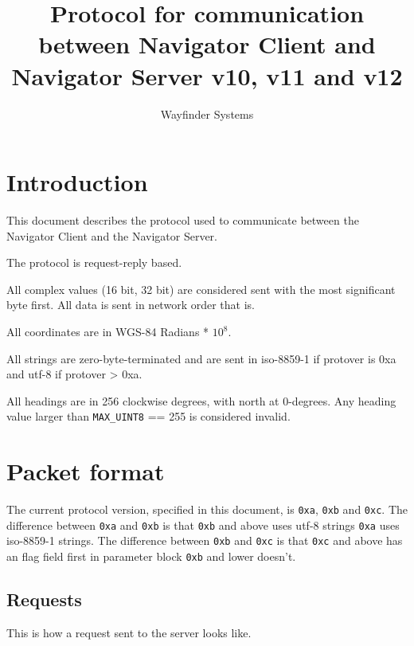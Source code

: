 \documentclass[a4paper]{article}
\title{Protocol for communication between Navigator Client and Navigator 
 Server v10, v11 and v12}
\author{Wayfinder Systems}
\begin{document}
\maketitle
\tableofcontents
\newpage



\section{Introduction}

This document describes the protocol used to communicate
between the Navigator Client and the Navigator Server.

The protocol is request-reply based.

All complex values (16 bit, 32 bit) are considered sent with
the most significant byte first. All data is sent in network order that is.

All coordinates are in WGS-84 Radians * $10^8$.

All strings are zero-byte-terminated and are sent in iso-8859-1 if
protover is 0xa and utf-8 if protover > 0xa.

All headings are in 256 clockwise degrees, with north at 0-degrees.
Any heading value larger than {\tt MAX\_UINT8} == 255 is considered invalid.



\section{Packet format}

The current protocol version, specified in this document, is {\tt 0xa}, 
{\tt 0xb} and {\tt 0xc}. 
The difference between {\tt 0xa} and {\tt 0xb} is that {\tt 0xb} and above
uses utf-8 strings {\tt 0xa} uses iso-8859-1 strings.
The difference between {\tt 0xb} and {\tt 0xc} is that {\tt 0xc} and above
has an flag field first in parameter block {\tt 0xb} and lower doesn't.



\subsection{Requests}
\label{request}

This is how a request sent to the server looks like.

~
\end{document}
